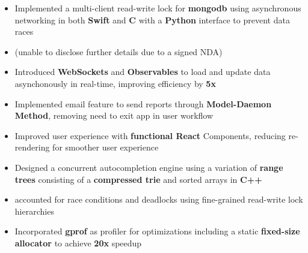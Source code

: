 \documentclass[10pt,a4paper,ragged2e]{altacv}
\begin{document}

\begin{fullwidth}
    \makecvheader
\end{fullwidth}




\begin{itemize}
    \item Implemented a multi-client read-write lock for \textbf{mongodb} using asynchronous networking in both \textbf{Swift} and \textbf{C} with a \textbf{Python} interface to prevent data races
    \item (unable to disclose further details due to a signed NDA)
\end{itemize}

\divider

\begin{itemize}
    \item Introduced \textbf{WebSockets} and \textbf{Observables} to load and update data asynchonously in real-time, improving efficiency by \textbf{5x}
    \item Implemented email feature to send reports through \textbf{Model-Daemon Method}, removing need to exit app in user workflow
    \item Improved user experience with \textbf{functional React} Components, reducing re-rendering for smoother user experience 
\end{itemize}


\begin{itemize}
    \item Designed a concurrent autocompletion engine using a variation of \textbf{range trees} consisting of a \textbf{compressed trie} and sorted arrays in \textbf{C++}
    \item accounted for race conditions and deadlocks using fine-grained read-write lock hierarchies
    \item Incorporated \textbf{gprof} as profiler for optimizations including a static \textbf{fixed-size allocator} to achieve \textbf{20x} speedup
\end{itemize}
\end{document}
